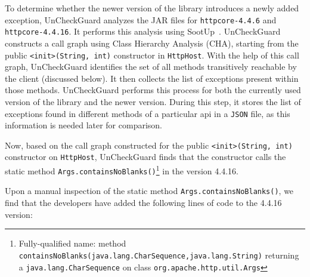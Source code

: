 To determine whether the newer version of the library introduces a newly added exception, UnCheckGuard analyzes the JAR files for \texttt{httpcore-4.4.6} and \texttt{httpcore-4.4.16}. It performs this analysis using SootUp~\cite{Karakaya24:_SootUp}. UnCheckGuard constructs a call graph using Class Hierarchy Analysis (CHA), starting from the public \texttt{<init>(String, int)} constructor in \texttt{HttpHost}. With the help of this call graph, UnCheckGuard identifies the set of all methods transitively reachable by the client (discussed below). It then collects the list of exceptions present within those methods. UnCheckGuard performs this process for both the currently used version of the library and the newer version. During this step, it stores the list of exceptions found in different methods of a particular \gls{api} in a \texttt{JSON} file, as this information is needed later for comparison.

Now, based on the call graph constructed for the public \texttt{<init>(String, int)} constructor on \texttt{HttpHost}, UnCheckGuard finds that the constructor calls the static method \texttt{Args.containsNoBlanks()}\footnote{Fully-qualified name: method \texttt{containsNoBlanks(java.lang.CharSequence,java.lang.String)} returning a \texttt{java.lang.CharSequence} on class \texttt{org.apache.http.util.Args} } in the version 4.4.16.


Upon a manual inspection of the static method \texttt{Args.containsNoBlanks()}, we find that the developers have added the following lines of code to the 4.4.16 version:

